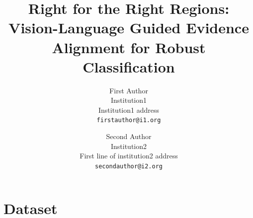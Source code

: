 \documentclass[10pt,twocolumn,letterpaper]{article}
\title{Right for the Right Regions: Vision-Language Guided Evidence Alignment for Robust Classification}
\author{First Author\\
Institution1\\
Institution1 address\\
{\tt\small firstauthor@i1.org}
\and
Second Author\\
Institution2\\
First line of institution2 address\\
{\tt\small secondauthor@i2.org}
}
\begin{document}
\maketitle
    



{
    \small
    
    
}
\newpage 
\appendix




\section{Dataset}
\end{document}
